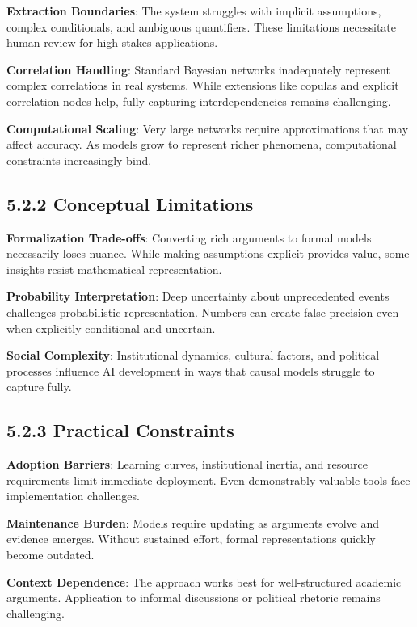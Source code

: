 \documentclass[
  11pt,
  letterpaper,
]{book}
\begin{document}
\textbf{Extraction Boundaries}: The system struggles with implicit
assumptions, complex conditionals, and ambiguous quantifiers. These
limitations necessitate human review for high-stakes applications.

\textbf{Correlation Handling}: Standard Bayesian networks inadequately
represent complex correlations in real systems. While extensions like
copulas and explicit correlation nodes help, fully capturing
interdependencies remains challenging.

\textbf{Computational Scaling}: Very large networks require
approximations that may affect accuracy. As models grow to represent
richer phenomena, computational constraints increasingly bind.

\subsection{5.2.2 Conceptual
Limitations}\label{sec-conceptual-limitations}

\textbf{Formalization Trade-offs}: Converting rich arguments to formal
models necessarily loses nuance. While making assumptions explicit
provides value, some insights resist mathematical representation.

\textbf{Probability Interpretation}: Deep uncertainty about
unprecedented events challenges probabilistic representation. Numbers
can create false precision even when explicitly conditional and
uncertain.

\textbf{Social Complexity}: Institutional dynamics, cultural factors,
and political processes influence AI development in ways that causal
models struggle to capture fully.

\subsection{5.2.3 Practical
Constraints}\label{sec-practical-constraints}

\textbf{Adoption Barriers}: Learning curves, institutional inertia, and
resource requirements limit immediate deployment. Even demonstrably
valuable tools face implementation challenges.

\textbf{Maintenance Burden}: Models require updating as arguments evolve
and evidence emerges. Without sustained effort, formal representations
quickly become outdated.

\textbf{Context Dependence}: The approach works best for well-structured
academic arguments. Application to informal discussions or political
rhetoric remains challenging.
\end{document}
